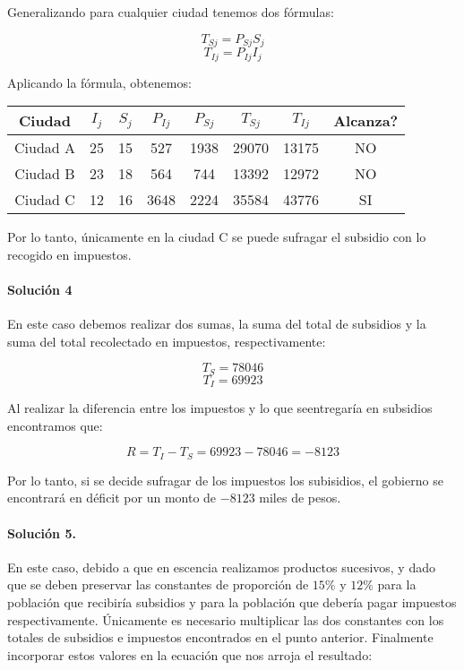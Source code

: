 \documentclass{article}
\begin{document}
Generalizando para cualquier ciudad tenemos dos fórmulas:

$$T_{Sj} = P_{Sj}S_j$$
$$T_{Ij} = P_{Ij}I_j$$

Aplicando la fórmula, obtenemos:

\begin{center}
	\begin{tabular}{ | c | c | c | c | c | c | c | c | }
		\hline
		\textbf{Ciudad} & \textbf{$I_j$} & \textbf{$S_j$} & \textbf{$P_{Ij}$} & \textbf{$P_{Sj}$} & \textbf{$T_{Sj}$} & \textbf{$T_{Ij}$} & \textbf{Alcanza?}\\
		\hline
		Ciudad A & 25 & 15 & 527 & 1938 & 29070 & 13175 & NO \\
		\hline
		Ciudad B & 23 & 18 & 564 & 744 & 13392 & 12972 & NO \\
		\hline
		Ciudad C & 12 & 16 & 3648 & 2224 & 35584 & 43776 & SI \\
		\hline
	\end{tabular}
\end{center}

Por lo tanto, únicamente en la ciudad C se puede sufragar el subsidio con lo recogido en impuestos.

\paragraph{Solución 4} En este caso debemos realizar dos sumas, la suma del total de subsidios y la suma del total recolectado en impuestos, respectivamente:

$$T_S = 78046$$
$$T_I = 69923$$

Al realizar la diferencia entre los impuestos y lo que seentregaría en subsidios encontramos que:

$$R = T_I - T_S = 69923 - 78046 = -8123$$

Por lo tanto, si se decide sufragar de los impuestos los subisidios, el gobierno se encontrará en déficit por un monto de $-8123$ miles de pesos.

\paragraph{Solución 5.} En este caso, debido a que en escencia realizamos productos sucesivos, y dado que se deben preservar las constantes de proporción de $15\%$ y $12\%$ para la población que recibiría subsidios y para la población que debería pagar impuestos respectivamente. Únicamente es necesario multiplicar las dos constantes con los totales de subsidios e impuestos encontrados en el punto anterior. Finalmente incorporar estos valores en la ecuación que nos arroja el resultado:
\end{document}
